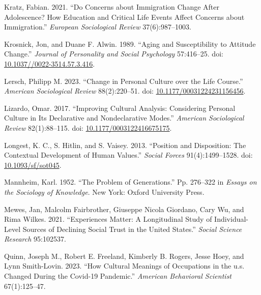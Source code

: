 \documentclass[
  12pt,
]{article}
\newlength{\cslhangindent}
\newlength{\cslentryspacingunit} %
\newenvironment{CSLReferences}[2] %
 {%
  \setlength{\parindent}{0pt}
  \ifodd #1
  \let\oldpar\par
  \def\par{\hangindent=\cslhangindent\oldpar}
  \fi
  \setlength{\parskip}{#2\cslentryspacingunit}
 }%
 {}
\begin{document}
\begin{CSLReferences}{1}{0}
\leavevmode{}%
Kratz, Fabian. 2021. {``Do Concerns about Immigration Change After
Adolescence? How Education and Critical Life Events Affect Concerns
about Immigration.''} \emph{European Sociological Review}
37(6):987--1003.

\leavevmode{}%
Krosnick, Jon, and Duane F. Alwin. 1989. {``Aging and {Susceptibility}
to {Attitude} {Change}.''} \emph{Journal of Personality and Social
Psychology} 57:416--25. doi:
\href{https://doi.org/10.1037//0022-3514.57.3.416}{10.1037//0022-3514.57.3.416}.

\leavevmode{}%
Lersch, Philipp M. 2023. {``Change in {Personal} {Culture} over the
{Life} {Course}.''} \emph{American Sociological Review} 88(2):220--51.
doi:
\href{https://doi.org/10.1177/00031224231156456}{10.1177/00031224231156456}.

\leavevmode{}%
Lizardo, Omar. 2017. {``Improving {Cultural} {Analysis}: {Considering}
{Personal} {Culture} in Its {Declarative} and {Nondeclarative}
{Modes}.''} \emph{American Sociological Review} 82(1):88--115. doi:
\href{https://doi.org/10.1177/0003122416675175}{10.1177/0003122416675175}.

\leavevmode{}%
Longest, K. C., S. Hitlin, and S. Vaisey. 2013. {``Position and
{Disposition}: {The} {Contextual} {Development} of {Human} {Values}.''}
\emph{Social Forces} 91(4):1499--1528. doi:
\href{https://doi.org/10.1093/sf/sot045}{10.1093/sf/sot045}.

\leavevmode{}%
Mannheim, Karl. 1952. {``The {Problem} of {Generations}.''} Pp. 276--322
in \emph{Essays on the {Sociology} of {Knowledge}}. New York: Oxford
University Press.

\leavevmode{}%
Mewes, Jan, Malcolm Fairbrother, Giuseppe Nicola Giordano, Cary Wu, and
Rima Wilkes. 2021. {``Experiences Matter: A Longitudinal Study of
Individual-Level Sources of Declining Social Trust in the United
States.''} \emph{Social Science Research} 95:102537.

\leavevmode{}%
Quinn, Joseph M., Robert E. Freeland, Kimberly B. Rogers, Jesse Hoey,
and Lynn Smith-Lovin. 2023. {``How Cultural Meanings of Occupations in
the u.s. Changed During the Covid-19 Pandemic.''} \emph{American
Behavioral Scientist} 67(1):125--47.


\end{CSLReferences}
\end{document}
